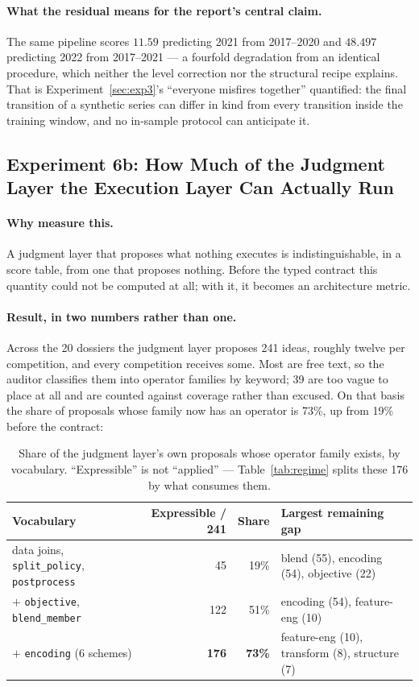 \documentclass[11pt,a4paper]{article}
\begin{document}
\paragraph{What the residual means for the report's central claim.} The same pipeline scores $11.59$ predicting 2021 from 2017--2020 and $48.497$ predicting 2022 from 2017--2021 --- a fourfold degradation from an identical procedure, which neither the level correction nor the structural recipe explains. That is Experiment~\ref{sec:exp3}'s ``everyone misfires together'' quantified: the final transition of a synthetic series can differ in kind from every transition inside the training window, and no in-sample protocol can anticipate it.

\subsection{Experiment 6b: How Much of the Judgment Layer the Execution Layer Can Actually Run}
\label{sec:coverage}

\paragraph{Why measure this.} A judgment layer that proposes what nothing executes is indistinguishable, in a score table, from one that proposes nothing. Before the typed contract this quantity could not be computed at all; with it, it becomes an architecture metric.

\paragraph{Result, in two numbers rather than one.} Across the 20 dossiers the judgment layer proposes 241 ideas, roughly twelve per competition, and every competition receives some. Most are free text, so the auditor classifies them into operator families by keyword; 39 are too vague to place at all and are counted against coverage rather than excused. On that basis the share of proposals whose family now has an operator is 73\%, up from 19\% before the contract:

\begin{table}[H]
\centering\small
\caption{Share of the judgment layer's own proposals whose operator family exists, by vocabulary. ``Expressible'' is not ``applied'' --- Table~\ref{tab:regime} splits these 176 by what consumes them.}
\label{tab:coverage}
\begin{tabular}{@{}lrrl@{}}
\toprule
\textbf{Vocabulary} & \textbf{Expressible / 241} & \textbf{Share} & \textbf{Largest remaining gap} \\
\midrule
data joins, \texttt{split\_policy}, \texttt{postprocess} & 45 & 19\% & blend (55), encoding (54), objective (22) \\
$+$ \texttt{objective}, \texttt{blend\_member} & 122 & 51\% & encoding (54), feature-eng (10) \\
$+$ \texttt{encoding} (6 schemes) & \textbf{176} & \textbf{73\%} & feature-eng (10), transform (8), structure (7) \\
\bottomrule
\end{tabular}
\end{table}
\end{document}
